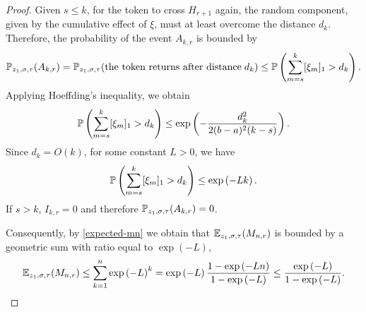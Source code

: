 \begin{proof}
	Given $s \leq k$, for the token to cross $H_{r+1}$ again, the random component, given by the cumulative effect of $\xi$, must at least overcome the distance $d_k$. Therefore, the probability of the event $A_{k, r}$ is bounded by
	\[
		\mathbb{P}_{z_1, \sigma, \tau}(A_{k, r}) = \mathbb{P}_{z_1, \sigma, \tau}(\text{the token returns after distance} \; d_k) \leq \mathbb{P}\left(\sum_{m=s}^k [\xi_m]_1 > d_k\right).
	\]
	Applying Hoeffding's inequality, we obtain
	$$
		\mathbb{P}\left(\sum_{m=s}^k [\xi_m]_1 > d_k\right) \leq \exp\left(-\frac{d_k^2}{2(b - a)^2(k-s)}\right).{}
	$$
	Since $d_k = O(k)$, for some constant $L > 0$, we have
	$$
		\mathbb{P}\left(\sum_{m=s}^k [\xi_m]_1 > d_k\right) \leq \exp\left(-Lk\right).
	$$
	If $s > k$, $I_{k, r} = 0$ and therefore $\mathbb{P}_{z_1, \sigma, \tau}(A_{k, r}) = 0$. 

	Consequently, by \eqref{expected-mn} we obtain that $\mathbb{E}_{z_1, \sigma, \tau}(M_{n, r})$ is bounded by a geometric sum with ratio equal to $\exp\left(-L\right)$,
	\[
		\mathbb{E}_{z_1, \sigma, \tau}(M_{n, r}) \leq \sum_{k = 1}^n \exp\left(-L\right)^k = \exp\left(-L\right)\frac{1 - \exp\left(-Ln\right)}{1 - \exp\left(-L\right)} \leq \frac{\exp\left(-L\right)}{1 - \exp\left(-L\right)}.
	\]
	\end{proof}




